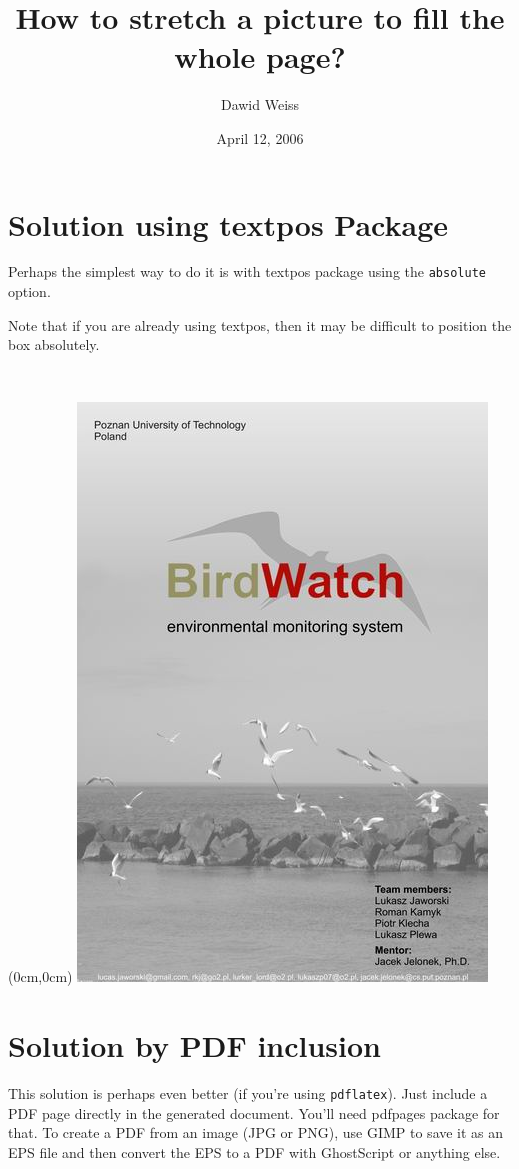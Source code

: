 \documentclass[a4paper,twoside]{article}
\title{How to stretch a picture to fill the whole page?}
\author{Dawid Weiss}
\date{April 12, 2006}
\begin{document}
\maketitle

\section{Solution using \textsf{textpos} Package}

Perhaps the simplest way to do it is with \textsf{textpos} package
using the \texttt{absolute} option.

Note that if you are already using \textsf{textpos}, then it may
be difficult to position the box absolutely.

\clearpage\thispagestyle{empty}~%
\textblockorigin{0cm}{0cm}
\begin{textblock*}{\paperwidth}(0cm,0cm)
\noindent \includegraphics[width=\paperwidth]{frontpage.jpg}
\end{textblock*}

\clearpage%
\section{Solution by PDF inclusion}

This solution is perhaps even better (if you're using \texttt{pdflatex}). Just
include a PDF page directly in the generated document. You'll need \textsf{pdfpages}
package for that. To create a PDF from an image (JPG or PNG), use GIMP to save it as
an EPS file and then convert the EPS to a PDF with GhostScript or anything else.

\end{document}
